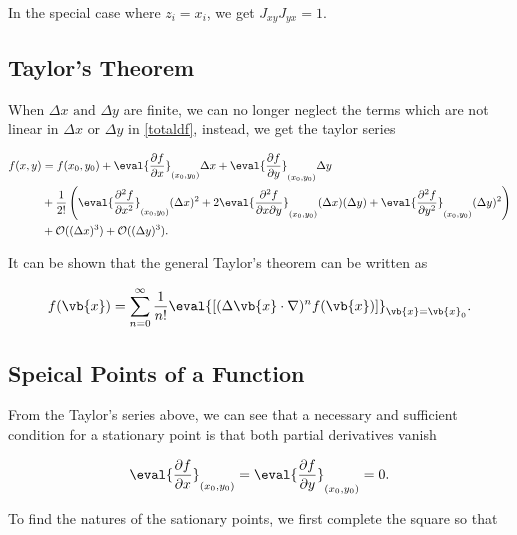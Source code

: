 \documentclass[english,a4paper,12pt]{report}
\begin{document}
In the special case where \(z_{i} = x_{i}  \), we get \(J_{xy}J_{yx} =1  \).  

\subsection{Taylor's Theorem}
When \(\Delta x \text { and }  \Delta y\) are finite, we can no longer neglect the terms which are not linear in \(\Delta x \text { or } \Delta y\) in \cref{totaldf}, instead, we get the taylor series 

\begin{equation}
    \begin{aligned}
    f(x,y) &= f(x_0 ,y_0 ) + \eval{\frac{\partial f}{\partial x}}_{(x_0 ,y_0 )}  \Delta x + \eval{\frac{\partial f}{\partial y}}_{(x_0 ,y_0 )} \Delta y \\ &+ \frac{1}{2!} \left( \eval{\frac{\partial^2 f}{\partial x^2}}_{(x_0 ,y_0 )}  (\Delta x)^2 + 2\eval{\frac{\partial^2 f}{\partial x \partial y}}_{(x_0 ,y_0 )}(\Delta x)(\Delta y) + \eval{\frac{\partial^2 f}{\partial y^2}}_{(x_0 ,y_0 )} (\Delta y)^2 \right) \\ &+ \mathcal{O}((\Delta x)^3 ) + \mathcal{O}((\Delta y)^3 ).        
    \end{aligned}
\end{equation}

It can be shown that the general Taylor's theorem can be written as 

\begin{equation}
    f(\vb{x} ) = \sum_{n=0}^{\infty} \frac{1}{n!} \eval{\left[ (\Delta \vb{x} \cdot \nabla )^{n} f(\vb{x} ) \right]}_{\vb{x} = \vb{x} _{0}}  .
\end{equation}

\subsection{Speical Points of a Function}

From the Taylor's series above, we can see that a necessary and sufficient condition for a stationary point is that both partial derivatives vanish

\begin{equation}
    \eval{\frac{\partial f}{\partial x}}_{(x_0 ,y_0 )} = \eval{\frac{\partial f}{\partial y}}_{(x_0 ,y_0 )} =0.
\end{equation}

To find the natures of the sationary points, we first complete the square so that 
\end{document}
